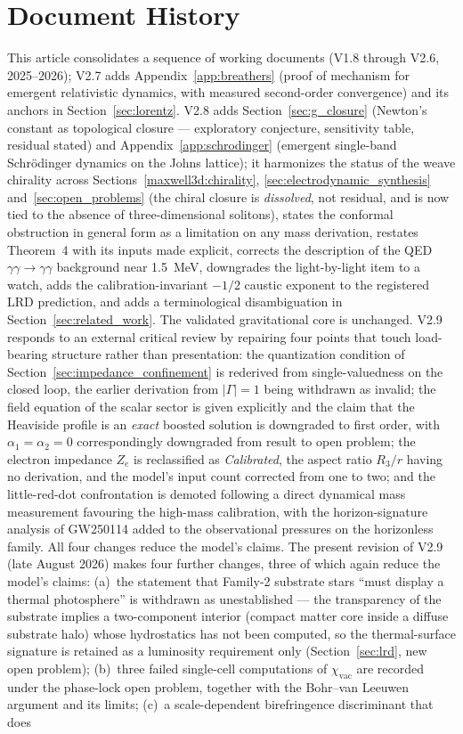\documentclass[11pt,a4paper]{article}
\theoremstyle{plain}
\theoremstyle{remark}
\begin{document}
\section{Document History}\label{app:history}
This article consolidates a sequence of working documents (V1.8 through V2.6, 2025--2026); V2.7 adds Appendix~\ref{app:breathers} (proof of mechanism for emergent relativistic dynamics, with measured second-order convergence) and its anchors in Section~\ref{sec:lorentz}. V2.8 adds Section~\ref{sec:g_closure} (Newton's constant as topological closure --- exploratory conjecture, sensitivity table, residual stated) and Appendix~\ref{app:schrodinger} (emergent single-band Schr\"odinger dynamics on the Johns lattice); it harmonizes the status of the weave chirality across Sections~\ref{maxwell3d:chirality}, \ref{sec:electrodynamic_synthesis} and~\ref{sec:open_problems} (the chiral closure is \emph{dissolved}, not residual, and is now tied to the absence of three-dimensional solitons), states the conformal obstruction in general form as a limitation on any mass derivation, restates Theorem~4 with its inputs made explicit, corrects the description of the QED $\gamma\gamma\to\gamma\gamma$ background near 1.5~MeV, downgrades the light-by-light item to a watch, adds the calibration-invariant $-1/2$ caustic exponent to the registered LRD prediction, and adds a terminological disambiguation in Section~\ref{sec:related_work}. The validated gravitational core is unchanged. V2.9 responds to an external critical review by repairing four points that touch load-bearing structure rather than presentation: the quantization condition of Section~\ref{sec:impedance_confinement} is rederived from single-valuedness on the closed loop, the earlier derivation from $|\Gamma| = 1$ being withdrawn as invalid; the field equation of the scalar sector is given explicitly and the claim that the Heaviside profile is an \emph{exact} boosted solution is downgraded to first order, with $\alpha_1 = \alpha_2 = 0$ correspondingly downgraded from result to open problem; the electron impedance $Z_e$ is reclassified as \emph{Calibrated}, the aspect ratio $R_3/r$ having no derivation, and the model's input count corrected from one to two; and the little-red-dot confrontation is demoted following a direct dynamical mass measurement favouring the high-mass calibration, with the horizon-signature analysis of GW250114 added to the observational pressures on the horizonless family. All four changes reduce the model's claims. The present revision of V2.9 (late August 2026) makes four further changes, three of which again reduce the model's claims: (a)~the statement that Family-2 substrate stars ``must display a thermal photosphere'' is withdrawn as unestablished --- the transparency of the substrate implies a two-component interior (compact matter core inside a diffuse substrate halo) whose hydrostatics has not been computed, so the thermal-surface signature is retained as a luminosity requirement only (Section~\ref{sec:lrd}, new open problem); (b)~three failed single-cell computations of $\chi_{\text{vac}}$ are recorded under the phase-lock open problem, together with the Bohr--van Leeuwen argument and its limits; (c)~a scale-dependent birefringence discriminant that does 
\end{document}
